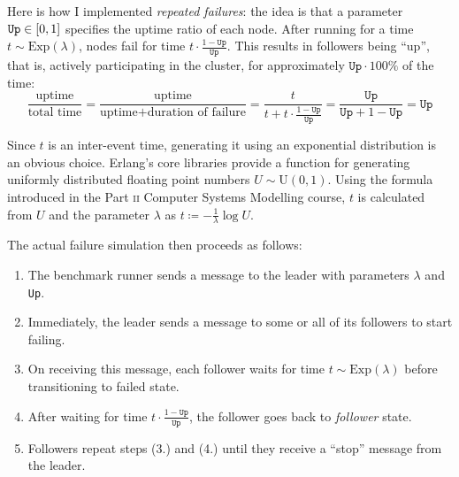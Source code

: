 \documentclass[12pt,chapterprefix=true,toc=bibliography,numbers=noendperiod,
               footnotes=multiple,twoside]{scrreprt}
\DeclarePairedDelimiter{\civ}{[}{]}
\begin{document}

Here is how I implemented \label{repeated-failures} \emph{repeated failures}: the idea is that a parameter \(\texttt{Up} \in \civ{0,1}\) specifies the uptime ratio of each node. After running for a time \(t \sim \text{Exp}(\lambda)\), nodes fail for time \(t \cdot \frac{1 - \texttt{Up}}{\texttt{Up}}\). This results in followers being \enquote{up}, that is, actively participating in the cluster, for approximately \(\texttt{Up} \cdot 100\%\) of the time:
\[ \frac{\text{uptime}}{\text{total time}}
 = \frac{\text{uptime}}{\text{uptime} + \text{duration of failure}}
 = \frac{t}{t + t \cdot \frac{1-\texttt{Up}}{\texttt{Up}}}
 = \frac{\texttt{Up}}{\texttt{Up} + 1 - \texttt{Up}} = \texttt{Up} \]

Since \(t\) is an inter-event time, generating it using an exponential distribution is an obvious choice. Erlang's core libraries provide a function for generating uniformly distributed floating point numbers \(U \sim \text{U}(0,1)\). Using the formula introduced in the Part \textsc{ii} Computer Systems Modelling course, \(t\) is calculated from \(U\) and the parameter \(\lambda\) as \(t \coloneqq -\frac{1}{\lambda}\log{U}\).

The actual failure simulation then proceeds as follows:
\begin{enumerate}
    \item The benchmark runner sends a message to the leader with parameters \(\lambda\) and \texttt{Up}.
    \item Immediately, the leader sends a message to some or all of its followers to start failing.
    \item On receiving this message, each follower waits for time \(t \sim \text{Exp}(\lambda)\) before transitioning to failed state.
    \item After waiting for time \(t \cdot \frac{1 - \texttt{Up}}{\texttt{Up}}\), the follower goes back to \textit{follower} state.
    \item Followers repeat steps (3.) and (4.) until they receive a \enquote{stop} message from the leader.
\end{enumerate}
\end{document}
